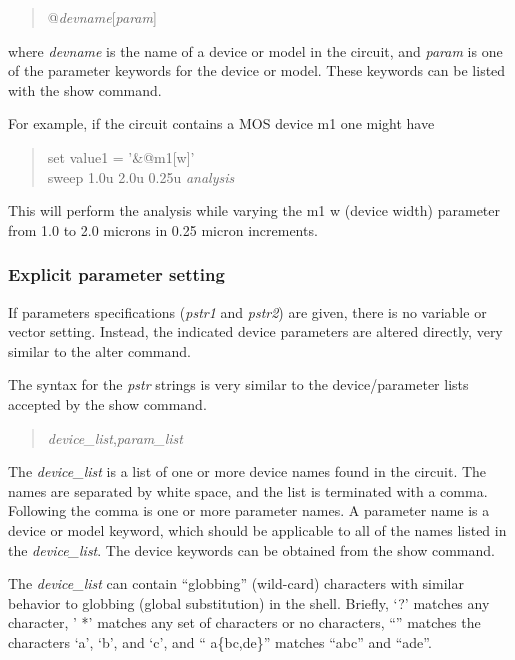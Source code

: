 \begin{enumerate}
{\begin{quote}
{\vt @}{\it devname\/}{\vt [}{\it param\/}{\vt ]}
\end{quote}

where {\it devname} is the name of a device or model in the circuit,
and {\it param} is one of the parameter keywords for the device or
model.  These keywords can be listed with the {\cb show} command.

For example, if the circuit contains a MOS device {\vt m1} one might
have

\begin{quote}
{\vt set value1 = '\&@m1[w]'}\\
{\vt sweep 1.0u 2.0u 0.25u} {\it analysis}
\end{quote}

This will perform the analysis while varying the {\vt m1} {\vt w}
(device width) parameter from 1.0 to 2.0 microns in 0.25 micron
increments.
}
\end{enumerate}

\subsubsection{Explicit parameter setting}
\label{psetting}

If parameters specifications ({\it pstr1} and {\it pstr2\/}) are
given, there is no variable or vector setting.  Instead, the indicated
device parameters are altered directly, very similar to the {\cb
alter} command.

The syntax for the {\it pstr} strings is very similar to the
device/parameter lists accepted by the {\cb show} command.

\begin{quote}
{\it device\_list\/}{\vt ,}{\it param\_list}
\end{quote}

The {\it device\_list} is a list of one or more device names found in
the circuit.  The names are separated by white space, and the list is
terminated with a comma.  Following the comma is one or more parameter
names.  A parameter name is a device or model keyword, which should be
applicable to all of the names listed in the {\it device\_list}.  The
device keywords can be obtained from the {\cb show} command.

The {\it device\_list} can contain ``globbing'' (wild-card)
characters with similar behavior to globbing (global substitution) in
the {\WRspice} shell.  Briefly, `{\vt ?}' matches any character, '{\vt
*}' matches any set of characters or no characters, ``{\vt [abc]}''
matches the characters `{\vt a}', `{\vt b}', and `{\vt c}', and ``{\vt
a}\{{\vt bc,de}\}'' matches ``{\vt abc}'' and ``{\vt ade}''.

